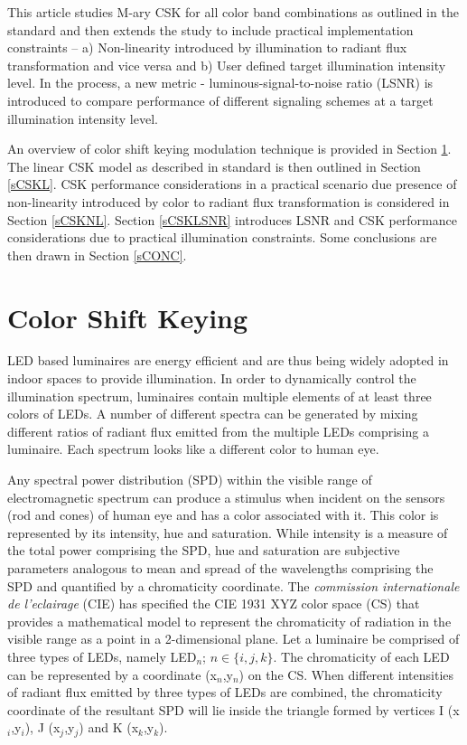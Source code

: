 \documentclass[10pt,letterpaper]{article}
\begin{document}
This article studies M-ary CSK for all color band combinations as outlined in the standard and then extends the study to include practical implementation constraints -- a) Non-linearity introduced by illumination to radiant flux transformation and vice versa and b) User defined target illumination intensity level. In the process, a new metric - luminous-signal-to-noise ratio (LSNR) is introduced to compare performance of different signaling schemes at a target illumination intensity level.

An overview of color shift keying modulation technique is provided in Section \ref{sCSK}. The linear CSK model as described in standard \cite{ieee802.15.7} is then outlined in Section \ref{sCSKL}. CSK performance considerations in a practical scenario due presence of non-linearity introduced by color to radiant flux transformation is considered in Section \ref{sCSKNL}. Section \ref{sCSKLSNR} introduces LSNR and CSK performance considerations due to practical illumination constraints. Some conclusions are then drawn in Section \ref{sCONC}.

\section{Color Shift Keying}\label{sCSK}
LED based luminaires are energy efficient and are thus being widely adopted in indoor spaces to provide illumination. In order to dynamically control the illumination spectrum, luminaires contain multiple elements of at least three colors of LEDs. A number of different spectra can be generated by mixing different ratios of radiant flux emitted from the multiple LEDs comprising a luminaire. Each spectrum looks like a different color to human eye.

Any spectral power distribution (SPD) within the visible range of electromagnetic spectrum can produce a stimulus when incident on the sensors (rod and cones) of human eye and has a color associated with it. This color is represented by its intensity, hue and saturation. While intensity is a measure of the total power comprising the SPD, hue and saturation are subjective parameters analogous to mean and spread of the wavelengths comprising the SPD and quantified by a chromaticity coordinate. The \textit{commission internationale de l'eclairage} (CIE) has specified the CIE 1931 XYZ color space (CS) that provides a mathematical model to represent the chromaticity of radiation in the visible range as a point in a 2-dimensional plane. Let a luminaire be comprised of three types of LEDs, namely LED$_{n}$; $n\in\{i,j,k\}$. The chromaticity of each LED can be represented by a coordinate (x$_{n}$,y$_{n}$) on the CS. When different intensities of radiant flux emitted by three types of LEDs are combined, the chromaticity coordinate of the resultant SPD will lie inside the triangle formed by vertices I (x$_{i}$,y$_{i}$), J (x$_{j}$,y$_{j}$) and K (x$_{k}$,y$_{k}$). 
\end{document}
